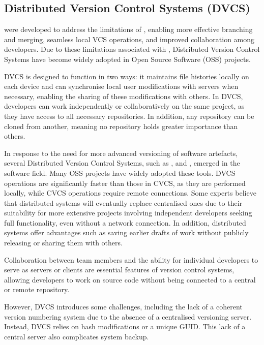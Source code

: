 \subsection{Distributed Version Control Systems (DVCS)}
\label{sec:dvcs}
 were developed to address the limitations of , enabling more effective branching and merging, seamless local VCS operations, and improved collaboration among developers. Due to these limitations associated with , Distributed Version Control Systems have become widely adopted in Open Source Software (OSS) projects.
\smallskip

DVCS is designed to function in two ways: it maintains file histories locally on each device and can synchronise local user modifications with servers when necessary, enabling the sharing of these modifications with others. In DVCS, developers can work independently or collaboratively on the same project, as they have access to all necessary repositories. In addition, any repository can be cloned from another, meaning no repository holds greater importance than others.
\smallskip

In response to the need for more advanced versioning of software artefacts, several Distributed Version Control Systems, such as , and , emerged in the software field. Many OSS projects have widely adopted these tools. DVCS operations are significantly faster than those in CVCS, as they are performed locally, while CVCS operations require remote connections. Some experts believe that distributed systems will eventually replace centralised ones due to their suitability for more extensive projects involving independent developers seeking full functionality, even without a network connection. In addition, distributed systems offer advantages such as saving earlier drafts of work without publicly releasing or sharing them with others.
\smallskip

Collaboration between team members and the ability for individual developers to serve as servers or clients are essential features of version control systems, allowing developers to work on source code without being connected to a central or remote repository.
\smallskip

However, DVCS introduces some challenges, including the lack of a coherent version numbering system due to the absence of a centralised versioning server. Instead, DVCS relies on hash modifications or a unique GUID. This lack of a central server also complicates system backup.
\smallskip

